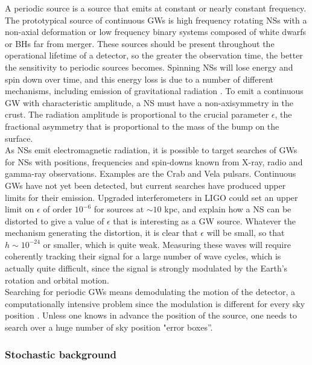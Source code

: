 \documentclass[binding=0.6cm, LaM]{sapthesis}
\begin{document}
	A periodic source is a source that emits at constant or nearly constant frequency.
	The prototypical source of continuous GWs is high frequency rotating NSs 
	with a non-axial deformation or low frequency binary systems 
	composed of white dwarfs or BHs far from merger. 
	These sources should be present throughout the operational lifetime of a detector, 
	so the greater the observation time, the better the sensitivity to periodic sources becomes. 
	Spinning NSs will lose energy and spin down over time, 
	and this energy loss is due to a number of different mechanisms, 
	including emission of gravitational radiation \cite{3}. 
	To emit a continuous GW with characteristic amplitude, 
	a NS must have a non-axisymmetry in the crust. 
	The radiation amplitude is proportional to the crucial parameter $\epsilon$, 
	the fractional asymmetry that is proportional to the mass of the bump on the surface. \\
	As NSs emit electromagnetic radiation, 
	it is possible to target searches of GWs for NSs with positions, 
	frequencies and spin-downs known from X-ray, radio and gamma-ray observations. 
	Examples are the Crab and Vela pulsars. 
	Continuous GWs have not yet been detected, 
	but current searches have produced upper limits for their emission. 
	Upgraded interferometers in LIGO could set an upper limit on  
	$\epsilon$ of order $10^{-6}$ for sources at $\sim10$ kpc, 
	and explain how a NS can be distorted to give a value of $\epsilon$ that is interesting as a GW source. 
	Whatever the mechanism generating the distortion, 
	it is clear that  $\epsilon$ will be small,
	so that $h \sim 10^{-24}$ or smaller, which is quite weak. 
	Measuring these waves will require
	coherently tracking their signal for a large number of wave cycles, 
	which is actually quite difficult, 
	since the signal is strongly modulated by the Earth’s rotation and orbital motion.\\
	Searching for periodic GWs means demodulating the motion of the detector, 
	a computationally intensive problem since the modulation is different for every sky position \cite{4}. 
	Unless one knows in advance the position of the source, 
	one needs to search over a huge number of sky position "error boxes”.

\subsubsection{Stochastic background}
\end{document}
